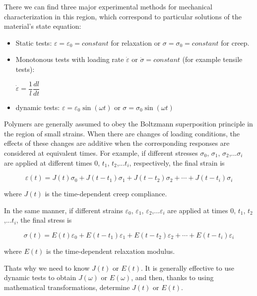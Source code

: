 \begin{itemize}
	There we can find three major experimental methods for mechanical characterization in this region, which correspond to particular solutions of the material's state equation: 
	
	\begin{itemize}
		\item Static tests: $\varepsilon = \varepsilon_{0} = constant$ for relaxation or $\sigma = \sigma_{0} = constant$ for creep. 
		
		\item Monotonous tests with loading rate $\dot{\varepsilon}$ or $\dot{\sigma} = constant$ (for example tensile tests): 
		
		$\dot{\varepsilon} = \dfrac{1}{l}\dfrac{dl}{dt}$
		
		\item dynamic tests: $\varepsilon = \varepsilon_{0} \sin(\omega t)$ or $\sigma = \sigma_{0} \sin(\omega t)$
	\end{itemize}
	
	Polymers are generally assumed to obey the Boltzmann superposition principle in the region of small strains. When there are changes of loading conditions, the effects of these changes are additive when the corresponding responses are considered at equivalent times. For example, if different stresses $\sigma_{0}$, $\sigma_{1}$, $\sigma_{2}$,...$\sigma_{i}$ are applied at different times $0$, $t_{1}$, $t_{2}$,...$t_{i}$, respectively, the final strain is
	
	\begin{equation}\label{eq2:boltzmann_eps}
		\varepsilon(t) = J(t)\sigma_{0} + J(t-t_{1})\sigma_{1}+J(t-t_{2})\sigma_{2}+\cdots+J(t-t_{i})\sigma_{i}
	\end{equation}
	
	where $J(t)$ is the time-dependent creep compliance.
	
	In the same manner, if different strains $\varepsilon_{0}$, $\varepsilon_{1}$, $\varepsilon_{2}$,...$\varepsilon_{i}$ are applied at times $0$, $t_{1}$, $t_{2}$,...$t_{i}$, the final stress is 
	
	\begin{equation}\label{eq2:boltzmann_sig}
	\sigma(t) = E(t)\varepsilon_{0} + E(t-t_{1})\varepsilon_{1}+ E(t-t_{2})\varepsilon_{2}+\cdots+E(t-t_{i})\varepsilon_{i}
	\end{equation}
	
	where $E(t)$ is the time-dependent relaxation modulus. 
	
	Thats why we need to know $J(t)$ or $E(t)$. It is generally effective to use dynamic tests to obtain $J(\omega)$ or $E(\omega)$, and then, thanks to using mathematical transformations, determine $J(t)$ or $E(t)$.
	

\end{itemize}
